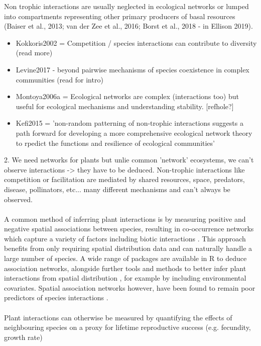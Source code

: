 \documentclass[a4,12pt]{article}
\begin{document}
       Non trophic interactions are usually neglected in ecological networks or lumped into compartments representing other primary producers of basal resources (Baiser et al., 2013; van der Zee et al., 2016; Borst et al., 2018 - in Ellison 2019).   
           \begin{itemize}
        \item Kokkoris2002 =  Competition / species interactions can contribute to diversity (read more)
        \item Levine2017 - beyond pairwise mechanisms of species coexistence in complex communities (read for intro)
        \item  Montoya2006a = Ecological networks are complex (interactions too) but useful for ecological mechanisms and understanding stability. [refhole?]
        \item Kefi2015 = 'non-random patterning of non-trophic interactions suggests a path forward for developing a more comprehensive ecological network theory to rpedict the functions and resilience of ecological communities'
    \end{itemize}

    2. We need networks for plants but unlie common 'network' ecosystems, we can't observe interactions -> they have to be deduced.
    Non-trophic interactions like competition or facilitation are mediated by shared resources, space, predators, disease, pollinators, etc... many different mechanisms and can't always be observed. 
    
    \paragraph{}
    A common method of inferring plant interactions is by measuring positive and negative spatial associations between species, resulting in  co-occurrence networks which capture a variety of factors including biotic interactions \citep{Losapio2019}. This approach benefits from only requiring spatial distribution data and can naturally handle a large number of species. A wide range of packages are available in R to deduce association networks, alongside further tools and methods to better infer plant interactions from spatial distribution \citep{Keil2019}, for example by including environmental covariates. Spatial association networks however, have been found to remain poor predictors of species interactions \citep{Sander2017, Thurman2019, Blanchet2020}. 

    \paragraph{}
    Plant interactions can otherwise be measured by quantifying the effects of neighbouring species on a proxy for lifetime reproductive success (e.g. fecundity, growth rate) \citep{Connell1961, Grace1990}
\end{document}
